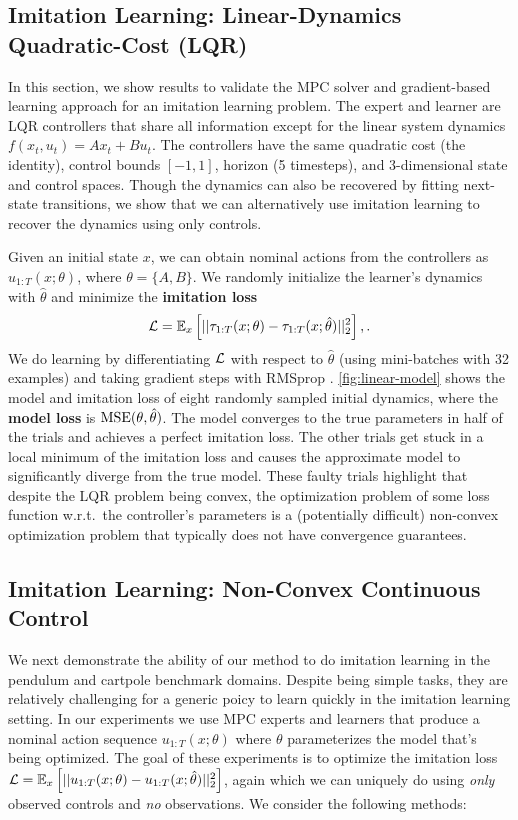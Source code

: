 \subsection{Imitation Learning: Linear-Dynamics Quadratic-Cost (LQR)}

In this section, we show results to validate the MPC solver and
gradient-based learning approach for an imitation learning problem.
The expert and learner are LQR controllers that share all information
except for the linear system dynamics $f(x_t, u_t) = Ax_t + Bu_t$.
The controllers have the same quadratic cost (the identity),
control bounds $[-1, 1]$, horizon (5 timesteps),
and 3-dimensional state and control spaces.
Though the dynamics can also be recovered by
fitting next-state transitions, we show that we can
alternatively use imitation learning to
recover the dynamics using only controls.

Given an initial state $x$, we can obtain nominal actions from the
controllers as $u_{1:T}(x; \theta)$, where $\theta=\{A, B\}$.
We randomly initialize the learner's dynamics with $\hat \theta$ and
minimize the \textbf{imitation loss}
$$\mathcal{L} = \mathbb{E}_x\left[ ||\tau_{1:T}(x; \theta) - \tau_{1:T}(x; \hat\theta)||_2^2\right],.$$
We do learning by differentiating $\mathcal{L}$ with
respect to $\hat \theta$ (using mini-batches with 32 examples) and
taking gradient steps with RMSprop \citep{tieleman2012lecture}.
\cref{fig:linear-model} shows the model and imitation loss of
eight randomly sampled initial dynamics,
where the \textbf{model loss} is ${\rm MSE}(\theta, \hat\theta)$.
The model converges to the true parameters in half of the trials
and achieves a perfect imitation loss.
The other trials get stuck in a local minimum of the
imitation loss and causes the approximate model to significantly
diverge from the true model.
These faulty trials highlight that despite the LQR problem
being convex, the optimization problem of some loss function
w.r.t.~the controller's parameters is a (potentially difficult)
non-convex optimization problem that typically does not have
convergence guarantees.

\subsection{Imitation Learning: Non-Convex Continuous Control}
\label{il:ctrl}
We next demonstrate the ability of our method to do imitation
learning in the pendulum and cartpole benchmark domains.
Despite being simple tasks, they are relatively challenging for a
generic poicy to learn quickly in the imitation learning setting.
In our experiments we use MPC experts and learners
that produce a nominal action sequence
$u_{1:T}(x; \theta)$ where $\theta$ parameterizes the
model that's being optimized.
The goal of these experiments is to optimize the imitation loss
$\mathcal{L} = \mathbb{E}_x\left[ ||u_{1:T}(x; \theta) - u_{1:T}(x; \hat\theta)||_2^2\right]$,
again which we can uniquely do using \emph{only} observed controls and
\emph{no} observations.
We consider the following methods:

